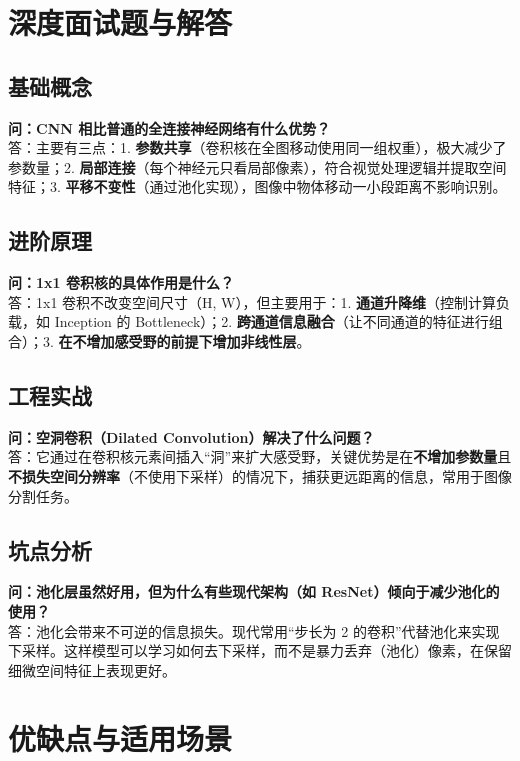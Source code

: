 \documentclass[12pt, a4paper]{book}
\begin{document}
\section{深度面试题与解答}
\subsection{基础概念}
\textbf{问：CNN 相比普通的全连接神经网络有什么优势？}\\
答：主要有三点：1. \textbf{参数共享}（卷积核在全图移动使用同一组权重），极大减少了参数量；2. \textbf{局部连接}（每个神经元只看局部像素），符合视觉处理逻辑并提取空间特征；3. \textbf{平移不变性}（通过池化实现），图像中物体移动一小段距离不影响识别。

\subsection{进阶原理}
\textbf{问：1x1 卷积核的具体作用是什么？}\\
答：1x1 卷积不改变空间尺寸（H, W），但主要用于：1. \textbf{通道升降维}（控制计算负载，如 Inception 的 Bottleneck）；2. \textbf{跨通道信息融合}（让不同通道的特征进行组合）；3. \textbf{在不增加感受野的前提下增加非线性层}。

\subsection{工程实战}
\textbf{问：空洞卷积（Dilated Convolution）解决了什么问题？}\\
答：它通过在卷积核元素间插入“洞”来扩大感受野，关键优势是在\textbf{不增加参数量}且\textbf{不损失空间分辨率}（不使用下采样）的情况下，捕获更远距离的信息，常用于图像分割任务。

\subsection{坑点分析}
\textbf{问：池化层虽然好用，但为什么有些现代架构（如 ResNet）倾向于减少池化的使用？}\\
答：池化会带来不可逆的信息损失。现代常用“步长为 2 的卷积”代替池化来实现下采样。这样模型可以学习如何去下采样，而不是暴力丢弃（池化）像素，在保留细微空间特征上表现更好。

\section{优缺点与适用场景}
\end{document}
